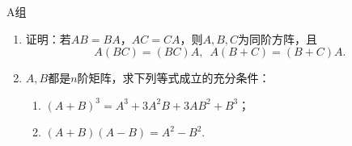 \vspace{2ex}
{\kaishu }
\begin{flushright}
    \kaishu

\end{flushright}

\centerline{\heiti A组}
\begin{enumerate}
    \item 证明：若$AB=BA$，$AC=CA$，则$A,B,C$为同阶方阵，且
          \[A(BC)=(BC)A,\enspace A(B+C)=(B+C)A.\]

    \item $A,B$都是$n$阶矩阵，求下列等式成立的充分条件：
          \begin{enumerate}
              \item $(A+B)^3=A^3+3A^2B+3AB^2+B^3$；

              \item $(A+B)(A-B)=A^2-B^2$.
          \end{enumerate}
\end{enumerate}

